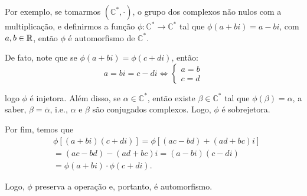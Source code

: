 	\begin{example}
	Por exemplo, se tomarmos 
	$(\mathbb{C^{*}}, \cdot)$, o grupo dos complexos não nulos com a
	multiplicação, e definirmos a função 
	$\phi : \mathbb{C^{*}}\to\mathbb{C^{*}}$ tal que 
	$\phi(a+bi) = a-bi$, com $a,b\in\mathbb{R}$, então $\phi$ é automorfismo 
	de $\mathbb{C^{*}}$.
	\par\vspace{0.3cm} De fato, note que se $\phi(a+bi) = \phi(c+di)$,
	então:
	\begin{equation*}
        a = bi = c - di 
        \iff
        \begin{cases}
            a = b \\ 
            c = d
        \end{cases}
	\end{equation*}
	\par\vspace{0.3cm} logo $\phi$ é injetora.  Além disso, se
	$\alpha\in\mathbb{C^{*}}$, então existe $\beta\in\mathbb{C^{*}}$ 
	tal que $\phi(\beta) = \alpha$, a saber, $\beta = \overline{\alpha}$, i.e.,
	$\alpha$ e $\beta$ são conjugados complexos.
	Logo, $\phi$ é sobrejetora.
	\par\vspace{0.3cm} Por fim, temos que
	\begin{align*}
        &\phi[(a + bi)(c + di)] = \phi[(ac - bd) + (ad + bc)i] \\ 
        &= (ac - bd) - (ad + bc)i = (a- bi)(c - di) \\
        &= \phi(a + bi)\cdot\phi(c + di).
	\end{align*}
	\par\vspace{0.3cm} Logo, $\phi$ preserva a operação e, portanto, 
	é automorfismo.
	\end{example}
